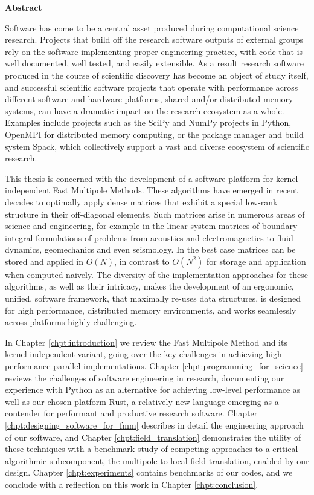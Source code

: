 \thispagestyle{plain}

\begin{center}
    \textbf{Abstract}
\end{center}

Software has come to be a central asset produced during
computational science research. Projects that build off the research software outputs of external groups rely on the software implementing proper engineering practice,
with code that is well documented, well tested, and easily extensible. As a
result research software produced in the course of scientific discovery has
become an object of study itself, and successful scientific software projects
that operate with performance across different software and hardware platforms,
shared and/or distributed memory systems, can have a dramatic impact on the
research ecosystem as a whole. Examples include projects such as the SciPy and
NumPy projects in Python, OpenMPI for distributed memory computing, or the package
manager and build system Spack, which collectively support a vast and diverse ecosystem of scientific
research.

This thesis is concerned with the development of a software platform
for kernel independent Fast Multipole Methods. These algorithms have emerged in recent decades to
optimally apply dense matrices that exhibit
a special low-rank structure in their off-diagonal elements. Such matrices arise
in numerous areas of science and engineering, for example in the linear system
matrices of boundary integral formulations of problems from acoustics and
electromagnetics to fluid dynamics, geomechanics and even seismology. In the
best case matrices can be stored and applied in $O(N)$, in contrast
to $O(N^2)$ for storage and application when computed
naively. The diversity of the implementation approaches for these algorithms, as
well as their intricacy, makes the development of an ergonomic,
unified, software framework, that maximally re-uses data structures, is designed
for high performance, distributed memory environments, and works seamlessly
across platforms highly challenging.

In Chapter \ref{chpt:introduction} we review the Fast Multipole Method and its kernel independent variant, going over the key challenges in achieving high performance parallel implementations. Chapter \ref{chpt:programming_for_science} reviews the challenges of software engineering in research, documenting our experience with Python as an alternative for achieving low-level performance as well as our chosen platform Rust, a relatively new language emerging as a contender for performant and productive research software. Chapter \ref{chpt:designing_software_for_fmm} describes in detail the engineering approach of our software, and Chapter \ref{chpt:field_translation} demonstrates the utility of these techniques with a benchmark study of competing approaches to a critical algorithmic subcomponent, the multipole to local field translation, enabled by our design. Chapter \ref{chpt:experiments} contains benchmarks of our codes, and we conclude with a reflection on this work in Chapter \ref{chpt:conclusion}.

